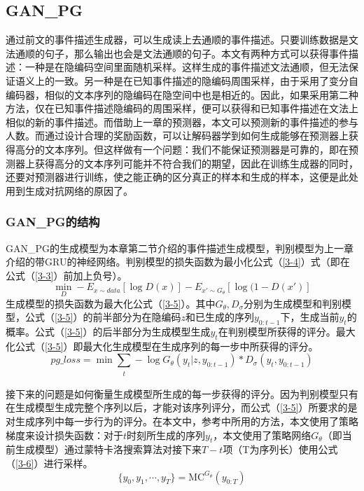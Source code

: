\subsection{GAN\_PG}
通过前文的事件描述生成器，可以生成读上去通顺的事件描述。只要训练数据是文法通顺的句子，那么输出也会是文法通顺的句子。本文有两种方式可以获得事件描述：一种是在隐编码空间里面随机采样。这样生成的事件描述文法通顺，但无法保证语义上的一致。另一种是在已知事件描述的隐编码周围采样，由于采用了变分自编码器，相似的文本序列的隐编码在隐空间中也是相近的。因此，如果采用第二种方法，仅在已知事件描述隐编码的周围采样，便可以获得和已知事件描述在文法上相似的新的事件描述。而借助上一章的预测器，本文可以预测新的事件描述的参与人数。而通过设计合理的奖励函数，可以让解码器学到如何生成能够在预测器上获得高分的文本序列。但这样做有一个问题：我们不能保证预测器是可靠的，即在预测器上获得高分的文本序列可能并不符合我们的期望，因此在训练生成器的同时，还要对预测器进行训练，使之能正确的区分真正的样本和生成的样本，这便是此处用到生成对抗网络的原因了。
\subsubsection{GAN\_PG的结构}
GAN\_PG的生成模型为本章第二节介绍的事件描述生成模型，判别模型为上一章介绍的带GRU的神经网络。判别模型的损失函数为最小化公式（\ref{3-4}）式（即在公式（\ref{3-3}）前加上负号）。
\begin{equation}\label{3-4}
    \mathop{min}_D-E_{x\sim data}[\log D(x)]-E_{x'\sim G_\theta}[\log(1-D(x')]
\end{equation}
生成模型的损失函数为最大化公式（\ref{3-5}）。其中$G_\theta,D_\sigma$分别为生成模型和判别模型，公式（\ref{3-5}）的前半部分为在隐编码$z$和已生成的序列$y_{0:t-1}$下，生成当前$y_t$的概率。公式（\ref{3-5}）的后半部分为生成模型生成$y_t$在判别模型所获得的评分。最大化公式（\ref{3-5}）即最大化生成模型在生成序列的每一步中所获得的评分。
\begin{equation}\label{3-5}
pg\_loss=\mathop{min}\sum_{\substack{t}}-\log G_\theta (y_t|z,y_{0:t-1})*D_\sigma (y_t,y_{0:t-1})
\end{equation}

接下来的问题是如何衡量生成模型所生成的每一步获得的评分。因为判别模型只有在生成模型生成完整个序列以后，才能对该序列评分，而公式（\ref{3-5}）所要求的是对生成序列中每一步行为的评分。在本文中，参考\cite{yu_seqgan:_2016}中所用的方法，本文使用了策略梯度来设计损失函数：对于$t$时刻所生成的序列$y_t$，本文使用了策略网络$G_\theta$（即当前生成模型）通过蒙特卡洛搜索算法对接下来$T-t$项（T为序列长）使用公式（\ref{3-6}）进行采样。
\begin{equation}\label{3-6}
    \{y_0,y_1,\dotsb,y_T\}=\mathrm{MC}^{G_\theta}(y_{0:T})
\end{equation}

